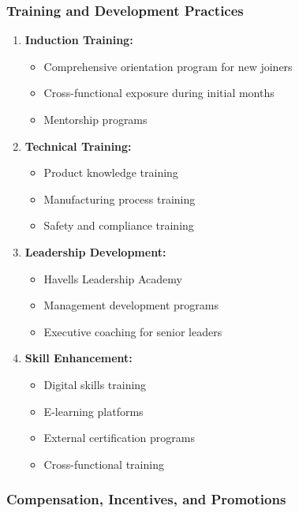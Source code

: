 \documentclass[12pt,a4paper]{article}
\begin{document}
\subsubsection{Training and Development Practices}

\begin{enumerate}[leftmargin=*]
    \item \textbf{Induction Training:}
    \begin{itemize}
        \item Comprehensive orientation program for new joiners
        \item Cross-functional exposure during initial months
        \item Mentorship programs
    \end{itemize}
    
    \item \textbf{Technical Training:}
    \begin{itemize}
        \item Product knowledge training
        \item Manufacturing process training
        \item Safety and compliance training
    \end{itemize}
    
    \item \textbf{Leadership Development:}
    \begin{itemize}
        \item Havells Leadership Academy
        \item Management development programs
        \item Executive coaching for senior leaders
    \end{itemize}
    
    \item \textbf{Skill Enhancement:}
    \begin{itemize}
        \item Digital skills training
        \item E-learning platforms
        \item External certification programs
        \item Cross-functional training
    \end{itemize}
\end{enumerate}

\subsubsection{Compensation, Incentives, and Promotions}
\end{document}
